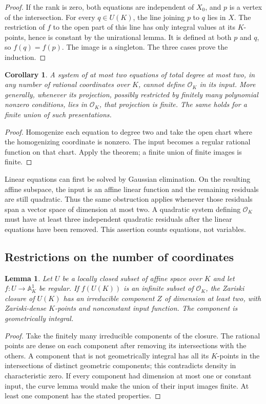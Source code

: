 \documentclass[11pt]{article}
\newtheorem{lemma}[theorem]{Lemma}
\newtheorem{corollary}[theorem]{Corollary}
\theoremstyle{definition}
\begin{document}
\begin{proof}
If the rank is zero, both equations are independent of $X_0$,
and $p$ is a vertex of the intersection.  For every $q\in U(K)$,
the line joining $p$ to $q$ lies in $X$.  The restriction of $f$
to the open part of this line has only integral values at its
$K$-points, hence is constant by the unirational lemma.  It is
defined at both $p$ and $q$, so $f(q)=f(p)$.  The image is a
singleton.  The three cases prove the induction.
\end{proof}

\begin{corollary}\label{p3sys:two-quadratics-affine}
A system of at most two equations of total degree at most two,
in any number of rational coordinates over $K$, cannot define
$\mathcal O_K$ in its input.  More generally, whenever its
projection, possibly restricted by finitely many polynomial
nonzero conditions, lies in $\mathcal O_K$, that projection is
finite.  The same holds for a finite union of such presentations.
\end{corollary}
\begin{proof}
Homogenize each equation to degree two and take the open chart
where the homogenizing coordinate is nonzero.  The input becomes
a regular rational function on that chart.  Apply the theorem;
a finite union of finite images is finite.
\end{proof}

Linear equations can first be solved by Gaussian elimination.  On the
resulting affine subspace, the input is an affine linear function and
the remaining residuals are still quadratic.  Thus the same obstruction
applies whenever those residuals span a vector space of dimension at
most two.  A quadratic system defining $\mathcal O_K$ must have at
least three independent quadratic residuals after the linear equations
have been removed.  This assertion counts equations, not variables.

\subsection{Restrictions on the number of coordinates}

\begin{lemma}\label{p3sys:horizontal-closure}
Let $U$ be a locally closed subset of affine space over $K$ and
let $f:U\to\mathbb A^1_K$ be regular.  If $f(U(K))$ is an
infinite subset of $\mathcal O_K$, the Zariski closure of $U(K)$
has an irreducible component $Z$ of dimension at least two,
with Zariski-dense $K$-points and nonconstant input function.
The component is geometrically integral.
\end{lemma}
\begin{proof}
Take the finitely many irreducible components of the closure.  The
rational points are dense on each component after removing its
intersections with the others.  A component that is not geometrically
integral has all its $K$-points in the intersections of distinct
geometric components; this contradicts density in characteristic
zero.  If every component had dimension at most one or constant
input, the curve lemma would make the union of their input images
finite.  At least one component has the stated properties.
\end{proof}
\end{document}
